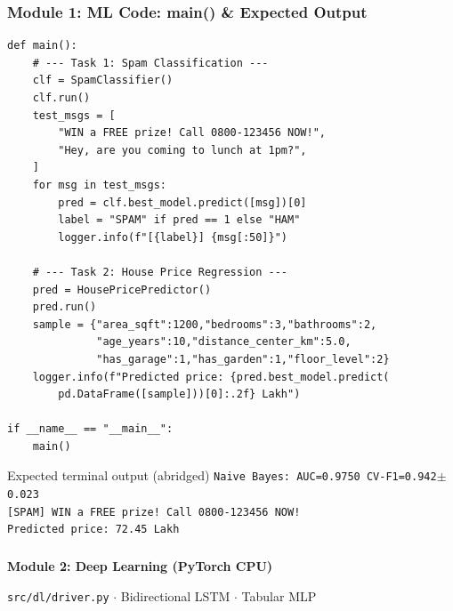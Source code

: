 \begin{frame}[fragile]\frametitle{Module 1: ML Code: main() \& Expected Output}
\begin{lstlisting}
def main():
    # --- Task 1: Spam Classification ---
    clf = SpamClassifier()
    clf.run()
    test_msgs = [
        "WIN a FREE prize! Call 0800-123456 NOW!",
        "Hey, are you coming to lunch at 1pm?",
    ]
    for msg in test_msgs:
        pred = clf.best_model.predict([msg])[0]
        label = "SPAM" if pred == 1 else "HAM"
        logger.info(f"[{label}] {msg[:50]}")

    # --- Task 2: House Price Regression ---
    pred = HousePricePredictor()
    pred.run()
    sample = {"area_sqft":1200,"bedrooms":3,"bathrooms":2,
              "age_years":10,"distance_center_km":5.0,
              "has_garage":1,"has_garden":1,"floor_level":2}
    logger.info(f"Predicted price: {pred.best_model.predict(
        pd.DataFrame([sample]))[0]:.2f} Lakh")

if __name__ == "__main__":
    main()
\end{lstlisting}
\begin{block}{Expected terminal output (abridged)}
\texttt{Naive Bayes: AUC=0.9750 CV-F1=0.942$\pm$0.023}\\
\texttt{[SPAM] WIN a FREE prize! Call 0800-123456 NOW!}\\
\texttt{Predicted price: 72.45 Lakh}
\end{block}
\end{frame}

\begin{frame}[fragile]\frametitle{}
\begin{center}
{\Large \textbf{Module 2: Deep Learning (PyTorch CPU)}}\

\texttt{src/dl/driver.py} $\cdot$ Bidirectional LSTM $\cdot$ Tabular MLP
\end{center}
\end{frame}

